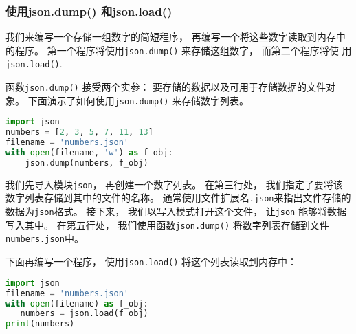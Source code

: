 \subsubsection{使用json.dump() 和json.load()}
我们来编写一个存储一组数字的简短程序， 再编写一个将这些数字读取到内存中的程序。 第一个程序将使用\verb|json.dump()| 来存储这组数字， 而第二个程序将使
用\verb|json.load()|.

函数\verb|json.dump()| 接受两个实参： 要存储的数据以及可用于存储数据的文件对象。 下面演示了如何使用\verb|json.dump()| 来存储数字列表。
\begin{lstlisting}[language=python]
import json
numbers = [2, 3, 5, 7, 11, 13]
filename = 'numbers.json'
with open(filename, 'w') as f_obj:
    json.dump(numbers, f_obj)
\end{lstlisting}
我们先导入模块\verb|json|， 再创建一个数字列表。 在第三行处， 我们指定了要将该数字列表存储到其中的文件的名称。 通常使用文件扩展名\verb|.json|来指出文件存储的数据为\verb|json|格式。 接下来， 我们以写入模式打开这个文件， 让\verb|json| 能够将数据写入其中。 在第五行处， 我们使用函数\verb|json.dump()| 将数字列表存储到文件\verb|numbers.json|中。

下面再编写一个程序， 使用\verb|json.load()| 将这个列表读取到内存中：

\begin{lstlisting}[language=python]
import json
filename = 'numbers.json'
with open(filename) as f_obj:
   numbers = json.load(f_obj)
print(numbers)
\end{lstlisting}
